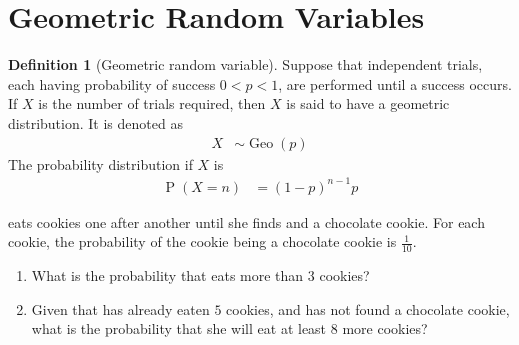 \documentclass[titlepage, fleqn, a4paper, 12pt, twoside]{article}
\theoremstyle{definition}
\newtheorem{definition}{Definition}
\theoremstyle{theorem}
\DeclareMathOperator{\prob}{\mathrm{P}}
\DeclareMathOperator{\geo}{\mathrm{Geo}}
\newcommand{\A}{\text{Alice}\xspace}
\begin{document}
\section{Geometric Random Variables}

\begin{definition}[Geometric random variable]
	Suppose that independent trials, each having probability of success $0 < p < 1$, are performed until a success occurs.
	If $X$ is the number of trials required, then $X$ is said to have a geometric distribution.
	It is denoted as
	\begin{align*}
		X & \sim \geo(p)
	\end{align*}
	The probability distribution if $X$ is
	\begin{align*}
		\prob(X = n) & = (1 - p)^{n - 1} p
	\end{align*}
\end{definition}

\begin{question}
	\A eats cookies one after another until she finds and a chocolate cookie.
	For each cookie, the probability of the cookie being a chocolate cookie is $\frac{1}{10}$.
	\begin{enumerate}
		\item What is the probability that \A eats more than $3$ cookies?
		\item Given that \A has already eaten $5$ cookies, and has not found a chocolate cookie, what is the probability that she will eat at least $8$ more cookies?
	\end{enumerate}
\end{question}
\end{document}
